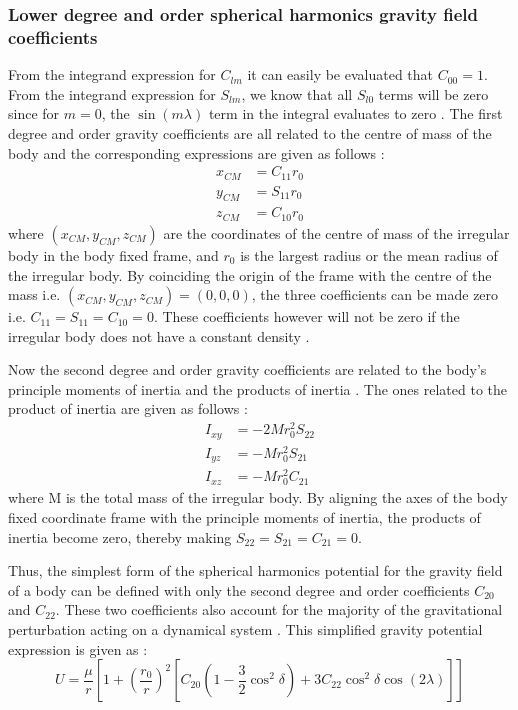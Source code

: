 \subsubsection{Lower degree and order spherical harmonics gravity field coefficients}
\label{Lower_degree_and_order_coefficients}
%
From the integrand expression for $C_{lm}$ it can easily be evaluated that $C_{00} = 1$. From the integrand expression for $S_{lm}$, we know that all $S_{l0}$ terms will be zero since for $m=0$, the $\sin(m\lambda)$ term in the integral evaluates to zero \cite{gillbook}. The first degree and order gravity coefficients are all related to the centre of mass of the body and the corresponding expressions are given as follows \cite{danbook}:
%
\begin{align}
x_{CM} &= C_{11} r_0 \\
y_{CM} &= S_{11} r_0 \\
z_{CM} &= C_{10} r_0
\end{align}
where $(x_{CM},y_{CM},z_{CM})$ are the coordinates of the centre of mass of the irregular body in the body fixed frame, and $r_0$ is the largest radius or the mean radius of the irregular body. By coinciding the origin of the frame with the centre of the mass i.e. $(x_{CM},y_{CM},z_{CM}) = (0,0,0)$, the three coefficients can be made zero i.e. $C_{11} = S_{11} = C_{10} = 0$. These coefficients however will not be zero if the irregular body does not have a constant density \cite{danbook}.

Now the second degree and order gravity coefficients are related to the body's principle moments of inertia and the products of inertia \cite{danbook}. The ones related to the product of inertia are given as follows \cite{danbook}:
\begin{align}
I_{xy} &= -2M r_0^2 S_{22} \\
I_{yz} &= -M r_0^2 S_{21} \\
I_{xz} &= -M r_0^2 C_{21}
\end{align}
where M is the total mass of the irregular body. By aligning the axes of the body fixed coordinate frame with the principle moments of inertia, the products of inertia become zero, thereby making $S_{22} = S_{21} = C_{21} = 0$.

Thus, the simplest form of the spherical harmonics potential for the gravity field of a body can be defined with only the second degree and order coefficients $C_{20}$ and $C_{22}$. These two coefficients also account for the majority of the gravitational perturbation acting on a dynamical system \cite{danbook}. This simplified gravity potential expression is given as \cite{danbook}:
\begin{equation}
U = \frac{\mu}{r}\left[1 + \left(\frac{r_0}{r}\right)^2\left[C_{20}\left(1-\frac{3}{2}\cos^2\delta\right) + 3C_{22}\cos^2\delta\cos(2\lambda)\right]\right]
\end{equation}

